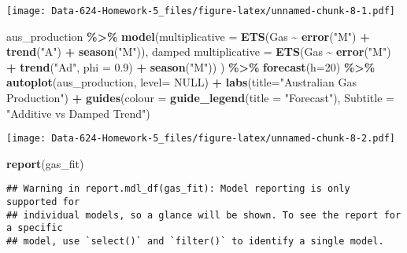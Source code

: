 \documentclass[
]{article}
\newenvironment{Shaded}{\begin{snugshade}}{\end{snugshade}}
\newcommand{\AttributeTok}[1]{\textcolor[rgb]{0.13,0.29,0.53}{#1}}
\newcommand{\ConstantTok}[1]{\textcolor[rgb]{0.56,0.35,0.01}{#1}}
\newcommand{\DecValTok}[1]{\textcolor[rgb]{0.00,0.00,0.81}{#1}}
\newcommand{\FloatTok}[1]{\textcolor[rgb]{0.00,0.00,0.81}{#1}}
\newcommand{\FunctionTok}[1]{\textcolor[rgb]{0.13,0.29,0.53}{\textbf{#1}}}
\newcommand{\NormalTok}[1]{#1}
\newcommand{\OtherTok}[1]{\textcolor[rgb]{0.56,0.35,0.01}{#1}}
\newcommand{\SpecialCharTok}[1]{\textcolor[rgb]{0.81,0.36,0.00}{\textbf{#1}}}
\newcommand{\StringTok}[1]{\textcolor[rgb]{0.31,0.60,0.02}{#1}}
\begin{document}
\texttt{[image: Data-624-Homework-5\_files/figure-latex/unnamed-chunk-8-1.pdf]}

\begin{Shaded}
\begin{Highlighting}[]
\NormalTok{aus\_production }\SpecialCharTok{\%\textgreater{}\%}
  \FunctionTok{model}\NormalTok{(}\AttributeTok{multiplicative =} \FunctionTok{ETS}\NormalTok{(Gas }\SpecialCharTok{\textasciitilde{}} \FunctionTok{error}\NormalTok{(}\StringTok{"M"}\NormalTok{) }\SpecialCharTok{+} \FunctionTok{trend}\NormalTok{(}\StringTok{"A"}\NormalTok{) }\SpecialCharTok{+} \FunctionTok{season}\NormalTok{(}\StringTok{"M"}\NormalTok{)),}
        \StringTok{\textasciigrave{}}\AttributeTok{damped multiplicative}\StringTok{\textasciigrave{}} \OtherTok{=} \FunctionTok{ETS}\NormalTok{(Gas }\SpecialCharTok{\textasciitilde{}} \FunctionTok{error}\NormalTok{(}\StringTok{"M"}\NormalTok{) }\SpecialCharTok{+} \FunctionTok{trend}\NormalTok{(}\StringTok{"Ad"}\NormalTok{, }\AttributeTok{phi =} \FloatTok{0.9}\NormalTok{) }\SpecialCharTok{+} \FunctionTok{season}\NormalTok{(}\StringTok{"M"}\NormalTok{))}
\NormalTok{  ) }\SpecialCharTok{\%\textgreater{}\%}
  \FunctionTok{forecast}\NormalTok{(}\AttributeTok{h=}\DecValTok{20}\NormalTok{) }\SpecialCharTok{\%\textgreater{}\%}
  \FunctionTok{autoplot}\NormalTok{(aus\_production, }\AttributeTok{level=} \ConstantTok{NULL}\NormalTok{) }\SpecialCharTok{+}
  \FunctionTok{labs}\NormalTok{(}\AttributeTok{title=}\StringTok{"Australian Gas Production"}\NormalTok{) }\SpecialCharTok{+}
  \FunctionTok{guides}\NormalTok{(}\AttributeTok{colour =} \FunctionTok{guide\_legend}\NormalTok{(}\AttributeTok{title =} \StringTok{"Forecast"}\NormalTok{),}
         \AttributeTok{Subtitle =} \StringTok{"Additive vs Damped Trend"}\NormalTok{)}
\end{Highlighting}
\end{Shaded}

\texttt{[image: Data-624-Homework-5\_files/figure-latex/unnamed-chunk-8-2.pdf]}

\begin{Shaded}
\begin{Highlighting}[]
\FunctionTok{report}\NormalTok{(gas\_fit)}
\end{Highlighting}
\end{Shaded}

\begin{verbatim}
## Warning in report.mdl_df(gas_fit): Model reporting is only supported for
## individual models, so a glance will be shown. To see the report for a specific
## model, use `select()` and `filter()` to identify a single model.
\end{verbatim}
\end{document}
